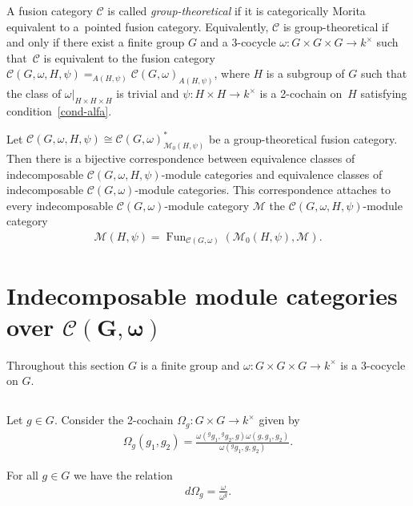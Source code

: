 \documentclass[pdftex]{sigma}
\numberwithin{equation}{section}
\newcommand{\cch}{\Omega}
\newcommand{\C}{{\mathcal C}}
\newcommand{\M}{{\mathcal M}}
\newcommand{\1}{\textbf{1}}
\newcommand\Fun{\operatorname{Fun}}
\begin{document}
A fusion category $\C$ is called \emph{group-theoretical} if it is categorically Morita equivalent to a~pointed fusion category. Equivalently, $\C$ is group-theoretical if and only if there exist a f\/inite group $G$ and a $3$-cocycle $\omega\colon G \times G \times G \to k^{\times}$ such that~$\C$ is equivalent to the fusion category $\C(G, \omega, H, \psi) = _{A(H, \psi)\!}\C(G, \omega)_{A(H, \psi)}$, where $H$ is a subgroup of $G$ such that the class of $\omega\vert_{H\times H \times H}$ is trivial and $\psi\colon H \times H \to k^{\times}$ is a 2-cochain on~$H$ satisfying condition~\eqref{cond-alfa}.

Let $\C(G, \omega, H, \psi) \cong \C(G, \omega)^*_{\M_0(H, \psi)}$ be a group-theoretical fusion category. Then there is a bijective correspondence between equivalence classes of indecomposable $\C(G, \omega, H, \psi)$-module categories and equivalence classes of indecomposable $\C(G, \omega)$-module categories. This correspondence attaches to every indecomposable $\C(G, \omega)$-module category $\M$ the $\C(G, \omega, H, \psi)$-module category
\begin{gather*}\M(H, \psi) = \Fun_{\C(G, \omega)}(\M_0(H, \psi), \M). \end{gather*}

\section[Indecomposable module categories over $\C(G, \omega)$]{Indecomposable module categories over $\boldsymbol{\C(G, \omega)}$}\label{ptd-mc}

Throughout this section $G$ is a f\/inite group and $\omega \colon G \times G \times G \to k^\times$ is a 3-cocycle on $G$.

\subsection{}\label{adj-action} Let $g \in G$. Consider the 2-cochain $\cch_g\colon G \times G \to k^{\times}$ given by
\begin{gather*}\cch_g(g_1, g_2) = \frac{\omega({}^gg_1, {}^gg_2, g) \omega(g, g_1, g_2)}{\omega({}^gg_1, g, g_2)}.
\end{gather*}

For all $g \in G$ we have the relation
\begin{gather}\label{o-oy}d\cch_g = \frac{\omega}{\omega^g}.
\end{gather}
\end{document}
